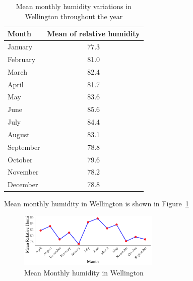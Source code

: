 \begin{table}[hbt]
	\centering
	\begin{tabular}{lc}
		\toprule
		 Month & Mean of relative humidity \\
		\midrule
		January & 77.3 \\ 
		February & 81.0 \\
		March & 82.4 \\
		April & 81.7 \\
		May & 83.6 \\ 
		June & 85.6 \\
		July & 84.4 \\
		August & 83.1 \\ 
		September & 78.8 \\
		October & 79.6 \\
		November & 78.2 \\
		December & 78.8 \\
		\bottomrule
	\end{tabular}
	\caption{Mean monthly humidity variations in Wellington throughout the year}
	\label{tab:humidity}
\end{table}

Mean monthly humidity in Wellington is shown in Figure~\ref{fig:humidity}  
\begin{figure}[hbt]
	\centering
	\includegraphics[width=0.6\textwidth]{humidity graph}
	\caption{Mean Monthly humidity in Wellington}
	\label{fig:humidity}
\end{figure}

